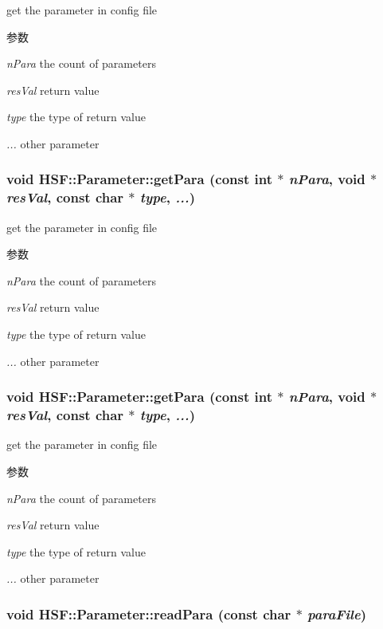 get the parameter in config file 
\begin{DoxyParams}{参数}
\item[{\em nPara}]the count of parameters \item[{\em resVal}]return value \item[{\em type}]the type of return value \item[{\em ...}]other parameter \end{DoxyParams}
\hypertarget{classHSF_1_1Parameter_a43cde4ecf939bca66b2dae7566eea056}{
\subsubsection[{getPara}]{\setlength{\rightskip}{0pt plus 5cm}void HSF::Parameter::getPara (const int $\ast$ {\em nPara}, \/  void $\ast$ {\em resVal}, \/  const char $\ast$ {\em type}, \/   {\em ...})}}
\label{classHSF_1_1Parameter_a43cde4ecf939bca66b2dae7566eea056}


get the parameter in config file 
\begin{DoxyParams}{参数}
\item[{\em nPara}]the count of parameters \item[{\em resVal}]return value \item[{\em type}]the type of return value \item[{\em ...}]other parameter \end{DoxyParams}
\hypertarget{classHSF_1_1Parameter_a43cde4ecf939bca66b2dae7566eea056}{
\subsubsection[{getPara}]{\setlength{\rightskip}{0pt plus 5cm}void HSF::Parameter::getPara (const int $\ast$ {\em nPara}, \/  void $\ast$ {\em resVal}, \/  const char $\ast$ {\em type}, \/   {\em ...})}}
\label{classHSF_1_1Parameter_a43cde4ecf939bca66b2dae7566eea056}


get the parameter in config file 
\begin{DoxyParams}{参数}
\item[{\em nPara}]the count of parameters \item[{\em resVal}]return value \item[{\em type}]the type of return value \item[{\em ...}]other parameter \end{DoxyParams}
\hypertarget{classHSF_1_1Parameter_a1701a921961849020f7dcd6bf2a8d150}{
\subsubsection[{readPara}]{\setlength{\rightskip}{0pt plus 5cm}void HSF::Parameter::readPara (const char $\ast$ {\em paraFile})}}
\label{classHSF_1_1Parameter_a1701a921961849020f7dcd6bf2a8d150}


